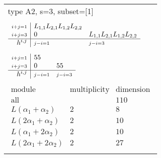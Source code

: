 \documentclass[crop,border=2mm]{standalone}
\begin{document}
\begin{tabular}{l}
{\huge type A2, s=3, subset=[1]}\\ \\


$\displaystyle
\begin{array}{r|l l}
	{\scriptstyle i+j=1}&L_{1,1}L_{2,1}L_{1,2}L_{2,2}&\\
	{\scriptstyle i+j=3}&0&L_{1,1}L_{2,1}L_{1,2}L_{2,2}\\
	\hline h^{i,j}&{\scriptstyle j-i=1}&{\scriptstyle j-i=3}
\end{array}
$ \\ \\


$\displaystyle
\begin{array}{r|l l}
	{\scriptstyle i+j=1}&55&\\
	{\scriptstyle i+j=3}&0&55\\
	\hline h^{i,j}&{\scriptstyle j-i=1}&{\scriptstyle j-i=3}
\end{array}
$ \\ \\


$\displaystyle
\begin{array}{rll}
	\text{module}&\text{multiplicity}&\text{dimension} \\ \hline \text{all}&&110 \\
	L\left(\alpha_{1}+\alpha_{2}\right)&2&8\\
	L\left( 2\alpha_{1}+\alpha_{2}\right)&2&10\\
	L\left(\alpha_{1}+ 2\alpha_{2}\right)&2&10\\
	L\left( 2\alpha_{1}+ 2\alpha_{2}\right)&2&27
\end{array}
$ \\ \\

\end{tabular}
\end{document}

